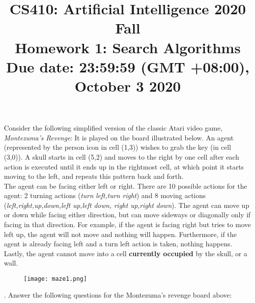 \documentclass{article}
\title{\normalsize
CS410: Artificial Intelligence 2020 Fall\\
Homework 1: Search Algorithms\\
Due date: 23:59:59 (GMT +08:00), October 3 2020}
\author{}
\date{}
\begin{document}
 
\maketitle

\noindent Consider the following simplified version of the classic Atari video game, \textit{Montezuma's Revenge}: It is played on the board illustrated below. An agent (represented by the person icon in cell (1,3)) wishes to grab the key (in cell (3,0)). A skull starts in cell (5,2) and moves to the right by one cell after each action is executed until it ends up in the rightmost cell, at which point it starts moving to the left, and repeats this pattern back and forth.\\

\noindent The agent can be facing either left or right. There are 10 possible actions for the agent: 2 turning actions (\textit{turn left,turn right}) and 8 moving actions (\textit{left,right,up,down,left up,left down, right up,right down}). The agent can move up or down while facing either direction, but can move sideways or diagonally only if facing in that direction. For example, if the agent is facing right but tries to move left up, the agent will not move and nothing will happen. Furthermore, if the agent is already facing left and a turn left action is taken, nothing happens.\\

\noindent Lastly, the agent cannot move into a cell \textbf{currently occupied} by the skull, or a wall.\\

\begin{figure}[h]
\centering
\texttt{[image: maze1.png]}
\end{figure}


\newpage
{}. Answer the following questions for the Montezuma’s revenge board above: \\
\end{document}
